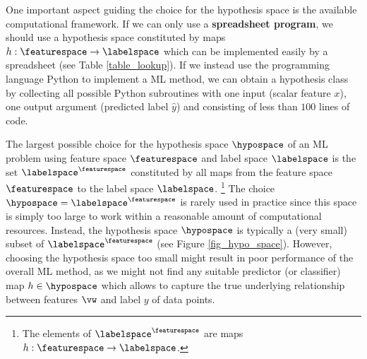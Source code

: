 \documentclass[12pt]{report}
\begin{document}

One important aspect guiding the choice for the hypothesis space is the available computational 
framework. If we can only use a {\bf spreadsheet program}, we should use a hypothesis space 
constituted by maps $h: \featurespace \rightarrow \labelspace$ which can be implemented easily 
by a spreadsheet (see Table \ref{table_lookup}). If we instead use the programming language 
Python to implement a ML method, we can obtain a hypothesis class by collecting all possible 
Python subroutines with one input (scalar feature $x$), one output argument (predicted label $\hat{y}$) 
and consisting of less than $100$ lines of code. %

The largest possible choice for the hypothesis space $\hypospace$ of an ML problem using 
feature space $\featurespace$ and label space $\labelspace$ is the set $\labelspace^{\featurespace}$ 
constituted by all maps from the feature space $\featurespace$ to the label space $\labelspace$.
\footnote{The elements of $\labelspace^{\featurespace}$ are maps $h: \featurespace \rightarrow \labelspace$.}   
The choice $\hypospace = \labelspace^{\featurespace}$ is rarely used in practice since this space is 
simply too large to work within a reasonable amount of computational resources. Instead, the 
hypothesis space $\hypospace$ is typically a (very small) subset of $\labelspace^{\featurespace}$ 
(see Figure \ref{fig_hypo_space}). However, choosing the hypothesis space too small might result 
in poor performance of the overall ML method, as we might not find any suitable predictor (or 
classifier) map $h \in \hypospace$ which allows to capture the true underlying relationship between 
features $\vw$ and label $y$ of data points. 
\end{document}
